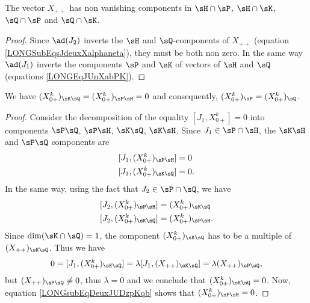 \begin{corollary}		\label{LONGCorHPHKQPQKXuu}
	The vector $X_{++}$ has non vanishing components in $\sH\cap\sP$, $\sH\cap\sK$, $\sQ\cap\sP$ and $\sQ\cap\sK$.
\end{corollary}

\begin{proof}
	Since $\ad(J_2)$ inverts the $\sH$ and $\sQ$-components of $X_{++}$ (equation \eqref{LONGSubEqsJdeuxXalphaneta}), they must be both non zero. In the same way $\ad(J_1)$ inverts the components $\sP$ and $\sK$ of vectors of $\sH$ and $\sQ$ (equations \eqref{LONGEqJUnXabPK}).
\end{proof}

\begin{lemma}		\label{LONGLEmDesZPP}
	We have	$(X^{k}_{0+})_{\sK\sQ}=(X^{k}_{0+})_{\sP\sH}=0$ and consequently, $(X^k_{0+})_{\sP}=(X^k_{0+})_{\sQ}$.
\end{lemma}

\begin{proof}
	Consider the decomposition of the equality $[J_1,X^{k}_{0+}]=0$ into components $\sP\sQ$, $\sP\sH$, $\sK\sQ$, $\sK\sH$. Since $J_1\in\sP\cap\sH$, the $\sK\sH$ and $\sP\sQ$ components are
	\begin{subequations}
		\begin{align}
			[J_1,(X^{k}_{0+})_{\sP\sH}] & =0  \\
			[J_1,(X^{k}_{0+})_{\sK\sQ}] & =0.
		\end{align}
	\end{subequations}
	In the same way, using the fact that $J_2\in\sP\cap\sQ$, we have
	\begin{subequations}	\label{LONGEqDeuxJUDzpKq}
		\begin{align}
			[J_2,(X_{0+}^{k})_{\sP\sH}] & =(X_{0+}^{k})_{\sK\sQ}                               \\
			[J_2,(X^{k}_{0+})_{\sK\sQ}] & =(X^{k}_{0+})_{\sP\sH}.		\label{LONGsubEqDeuxJUDzpKqb}
		\end{align}
	\end{subequations}
	Since $\dim(\sK\cap\sQ)=1$, the component $(X^{k}_{0+})_{\sK\sQ}$ has to be a multiple of $(X_{++})_{\sK\sQ}$. Thus we have
	\begin{equation}
		0=[J_1,(X^{k}_{0+})_{\sK\sQ}]=\lambda [J_1,(X_{++})_{\sK\sQ}]=\lambda (X_{++})_{\sP\sQ},
	\end{equation}
	but $(X_{++})_{\sP\sQ}\neq 0$, thus $\lambda=0$ and we conclude that $(X_{0+}^{k})_{\sK\sQ}=0$. Now, equation \eqref{LONGsubEqDeuxJUDzpKqb} shows that $(X_{0+}^{k})_{\sP\sH}=0$.
\end{proof}

